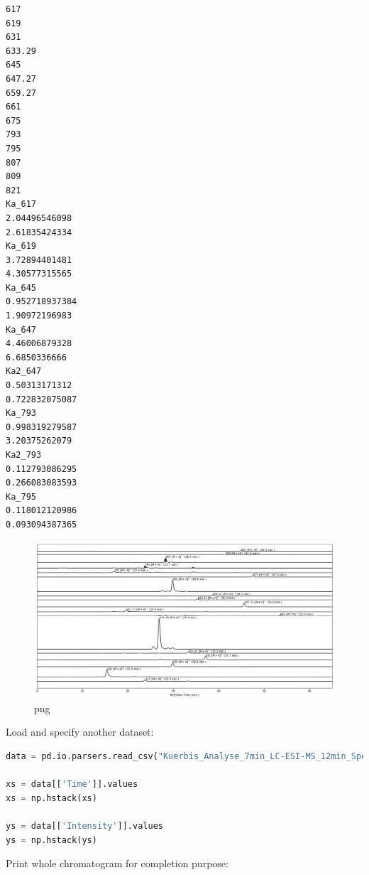 \begin{lstlisting}
617
619
631
633.29
645
647.27
659.27
661
675
793
795
807
809
821
Ka_617
2.04496546098
2.61835424334
Ka_619
3.72894401481
4.30577315565
Ka_645
0.952718937384
1.90972196983
Ka_647
4.46006879328
6.6850336666
Ka2_647
0.50313171312
0.722832075087
Ka_793
0.998319279587
3.20375262079
Ka2_793
0.112793086295
0.266083083593
Ka_795
0.118012120986
0.093094387365
\end{lstlisting}

\begin{figure}[htbp]
\centering
\includegraphics{VWA_Analyse_LC-ESI-MS_files/VWA_Analyse_LC-ESI-MS_9_1.png}
\caption{png}
\end{figure}

Load and specify another dataset:

\begin{lstlisting}[language=Python]
data = pd.io.parsers.read_csv("Kuerbis_Analyse_7min_LC-ESI-MS_12min_Spektrum.csv")

xs = data[['Time']].values
xs = np.hstack(xs)

ys = data[['Intensity']].values
ys = np.hstack(ys)
\end{lstlisting}

Print whole chromatogram for completion purpose:

